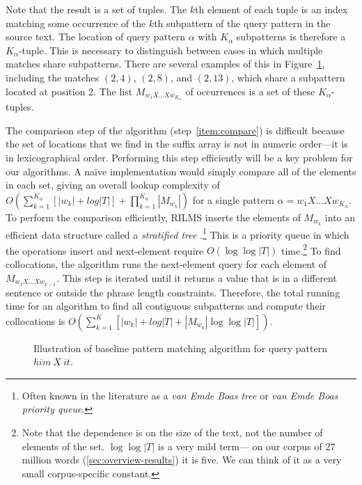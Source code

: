 \noindent  Note that the result is a set of tuples.  The $k$th 
element of each tuple is an index matching some occurrence of the $k$th 
subpattern of the query pattern in the source text.  The location of query pattern $\alpha$
with $K_\alpha$ subpatterns is therefore a $K_\alpha$-tuple.  
This is necessary to distinguish between cases in which multiple
matches share subpatterns.  There are several examples of
this in Figure~\ref{fig:baseline-algorithm}, including the matches 
$(2,4)$, $(2,8)$, and $(2,13)$, which share a subpattern located at position 2.
The list $M_{w_1 X ... X w_{K_\alpha}}$
of occurrences is a set of these $K_\alpha$-tuples.

The comparison step of the algorithm (step~\ref{item:compare})
is difficult because the set of locations that we find in the 
suffix array is not in numeric order---it is in lexicographical order.
Performing this step efficiently will be a key problem for our algorithms.
A na\"{i}ve implementation would simply compare all of the elements
in each set, giving an overall lookup complexity of 
$O(\sum_{k=1}^{K_\alpha} \left[|w_k| + log |T|\right] + \prod_{k=1}^{K_\alpha} |M_{w_k}|)$
for a single pattern $\alpha = w_1 X ... X w_{K_\alpha}$.  
To perform the comparison efficiently, 
RILMS inserts the elements of $M_{w_k}$ into 
an efficient data structure called a {\em stratified tree}
\citep{emde-boas:1977:mst}.\footnote{Often known in the literature as a
{\em van Emde Boas tree} or {\em van Emde Boas priority queue}.}  
This is a priority queue in which the
operations {\sc insert} and {\sc next-element} require $O(\log \log |T|)$ 
time.\footnote{Note that the dependence is on the size of the text, 
not the number of elements of the set.  $\log \log |T|$ is a very mild term---
on our corpus of 27 million words (\textsection\ref{sec:overview-results}) it is five.  
We can think of it as a very small corpus-specific constant.}
To find collocations, the algorithm runs the {\sc next-element} query
for each element of $M_{w_1 X ... X w_{k-1}}$.  This step is iterated
until it returns a value that is
in a different sentence or outside the phrase length constraints.
Therefore, the total running time for an algorithm to find all contiguous
subpatterns and compute their collocations is
$O(\sum_{k=1}^K \left[ |w_k| + log |T| + |M_{w_k}| \log \log |T| \right])$.

\figpreamble
\begin{figure}
	\figfontsize{
	\begin{center}
		
	\end{center}}
	\figpostamble
	\caption{Illustration of baseline pattern matching algorithm for query pattern $him~X~it$.}
	\label{fig:baseline-algorithm}
\end{figure}

